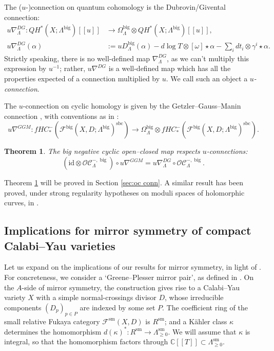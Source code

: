\documentclass{article}
\newtheorem{thm}[lem]{Theorem}
\def\fuk{\EuF}
\def\cO{\mathcal{O}}
\def\cC{\mathcal{C}}
\def\fuk{\mathcal{F}}
\def\id{\mathrm{id}}
\def\C{\mathbb{C}}
\def\big{{\operatorname{big}}}
\def\sm{{\operatorname{sm}}}
\def\sbc{{\operatorname{sbc}}}
\def\novblam{t}
\begin{document}
The ($u$-)connection on quantum cohomology is the Dubrovin/Givental connection:
\begin{align}
    u\nabla^{DG}_\Lambda: QH^*(X;\Lambda^\big)[[u]] & \to \Omega^\big_\Lambda \otimes QH^*(X;\Lambda^\big)[[u]],\\
    u\nabla^{DG}_\Lambda(\alpha) &:= uD^\big_\Lambda(\alpha) - d\log T \otimes [\omega] \star \alpha - \sum_i d\novblam_i \otimes \gamma^i \star \alpha.
\end{align}
Strictly speaking, there is no well-defined map $\nabla^{DG}_\Lambda$, as we can't multiply this expression by $u^{-1}$; rather, $u\nabla^{DG}$ is a well-defined map which has all the properties expected of a connection multiplied by $u$. 
We call such an object a \emph{$u$-connection}.

The $u$-connection on cyclic homology is given by the Getzler--Gauss--Manin connection \cite{Getzler_GM}, with conventions as in \cite{Sheridan_formulae}:
$$u\nabla^{GGM} : fHC_*^-(\fuk^\big(X,D;\Lambda^\big)^\sbc) \to \Omega^\big_\Lambda \otimes fHC_*^-(\fuk^\big(X,D;\Lambda^\big)^\sbc).$$

\begin{thm}\label{thm:oc_conn_bc}
    The big negative cyclic open--closed map respects $u$-connections:
    $$\left(\id \otimes \cO\cC_\Lambda^{-,\big} \right) \circ u\nabla^{GGM} = u\nabla^{DG}_\Lambda \circ \cO\cC_\Lambda^{-,\big}.$$
\end{thm}

Theorem \ref{thm:oc_conn_bc} will be proved in Section \ref{sec:oc conn}. A similar result has been proved, under strong regularity hypotheses on moduli spaces of holomorphic curves, in \cite[Theorem 1.7]{Hugtenburg:OC}.

\subsection{Implications for mirror symmetry of compact Calabi--Yau varieties}\label{sec:frob}

Let us expand on the implications of our results for mirror symmetry, in light of \cite{Ganatra2015}. 
For concreteness, we consider a `Greene--Plesser mirror pair', as defined in \cite{sheridan2021homological}. 
On the $A$-side of mirror symmetry, the construction gives rise to a Calabi--Yau variety $X$ with a simple normal-crossings divisor $D$, whose irreducible components $(D_p)_{p \in P}$ are indexed by some set $P$. 
The coefficient ring of the small relative Fukaya category $\fuk^\sm(X,D)$ is $R^\sm$; and a K\"ahler class $\kappa$ determines the homomorphism $d(\kappa)^*:R^\sm \to \Lambda^\sm_{\ge 0}$. 
We will assume that $\kappa$ is integral, so that the homomorphism factors through $\C[[T]] \subset \Lambda^\sm_{\ge 0}$. 
\end{document}
